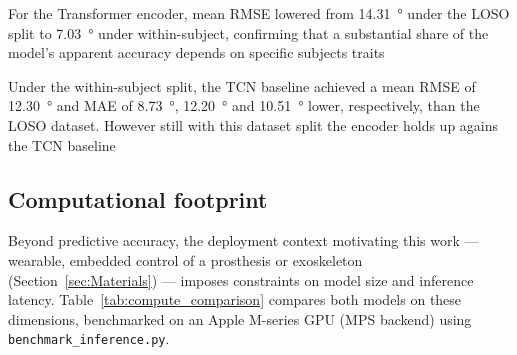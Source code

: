 \begin{table}[htbp]
    \centering
    \caption{Test-set RMSE and MAE under the LOSO split versus the within-subject split.}
    \label{tab:split_strategy}
\end{table}

For the Transformer encoder, mean RMSE lowered from \SI{14.31}{\degree} under the
LOSO split to \SI{7.03}{\degree} under within-subject, confirming that a substantial share of the model's apparent accuracy depends on specific subjects traits

Under the within-subject split, the TCN baseline
achieved a mean RMSE of \SI{12.30}{\degree}
and MAE of \SI{8.73}{\degree}, \SI{12.20}{\degree} and \SI{10.51}{\degree}
lower, respectively, than the LOSO dataset.
However still with this dataset split the encoder holds up agains the TCN baseline

\subsection{Computational footprint}\label{sec:results-compute}

Beyond predictive accuracy, the deployment context motivating this work —
wearable, embedded control of a prosthesis or exoskeleton
(Section~\ref{sec:Materials}) — imposes constraints on model size and
inference latency. Table~\ref{tab:compute_comparison} compares both models on
these dimensions, benchmarked on an Apple M-series GPU (MPS backend) using
\texttt{benchmark\_inference.py}.

\begin{table}[htbp]
    \centering
    \caption{Model size and single-sample inference latency on an Apple
    M-series GPU (MPS backend), measured with \texttt{benchmark\_inference.py}.}
    \label{tab:compute_comparison}
\end{table}

